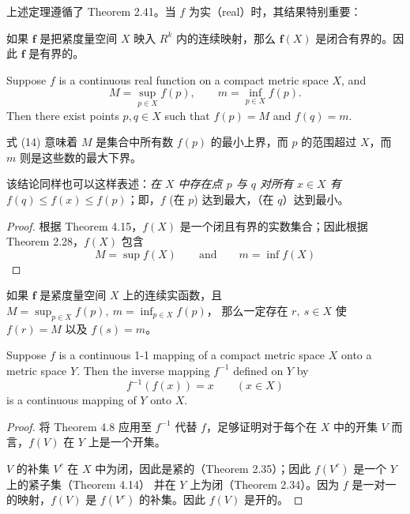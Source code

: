 \documentclass[../poma-notes.tex]{subfiles}
\begin{document}
上述定理遵循了 Theorem 2.41。当 $f$ 为实（real）时，其结果特别重要：

\begin{anote}
  如果 $\mathbf{f}$ 是把紧度量空间 $X$ 映入 $R^k$ 内的连续映射，那么 $\mathbf{f}(X)$ 是闭合有界的。因此 $\mathbf{f}$
  是有界的。
\end{anote}

\begin{theorem}
  Suppose $f$ is a continuous real function on a compact metric space $X$, and
  \begin{equation}
    M = \sup_{p \in X} f(p), \qquad m = \inf_{p \in X} f(p).
  \end{equation}
  Then there exist points $p, q \in X$ such that $f(p) = M$ and $f(q) = m$.
\end{theorem}

式 (14) 意味着 $M$ 是集合中所有数 $f(p)$ 的最小上界，而 $p$ 的范围超过 $X$，而 $m$ 则是这些数的最大下界。

该结论同样也可以这样表述：\textit{在 $X$ 中存在点 $p$ 与 $q$ 对所有 $x \in X$ 有 $f(q) \le f(x) \le f(p)$}；即，$f$
(在 $p$) 达到最大，（在 $q$）达到最小。

\begin{proof}
  根据 Theorem 4.15，$f(X)$ 是一个闭且有界的实数集合；因此根据 Theorem 2.28，$f(X)$ 包含
  \[
    M = \sup f(X) \qquad \text{and} \qquad m = \inf f(X)
  \]
\end{proof}

\begin{anote}
  如果 $\mathbf{f}$ 是紧度量空间 $X$ 上的连续实函数，且 $M = \sup_{p \in X} f(p),\ m = \inf_{p \in X} f(p)$，
  那么一定存在 $r,\ s \in X$ 使 $f(r) = M$ 以及 $f(s) = m$。
\end{anote}

\begin{theorem}
  Suppose $f$ is a continuous 1-1 mapping of a compact metric space $X$ onto a metric space $Y$. Then the
  inverse mapping $f^{-1}$ defined on $Y$ by
  \[
    f^{-1}(f(x)) = x \qquad (x \in X)
  \]
  is a continuous mapping of $Y$ onto $X$.
\end{theorem}

\begin{proof}
  将 Theorem 4.8 应用至 $f^{-1}$ 代替 $f$，足够证明对于每个在 $X$ 中的开集 $V$ 而言，$f(V)$ 在 $Y$ 上是一个开集。

  $V$ 的补集 $V^c$ 在 $X$ 中为闭，因此是紧的（Theorem 2.35）；因此 $f(V^c)$ 是一个 $Y$ 上的紧子集（Theorem 4.14）
  并在 $Y$ 上为闭（Theorem 2.34）。因为 $f$ 是一对一的映射，$f(V)$ 是 $f(V^c)$ 的补集。因此 $f(V)$ 是开的。
\end{proof}
\end{document}
